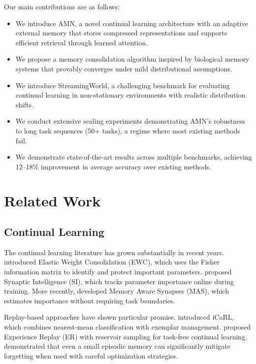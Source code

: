 \documentclass[11pt]{article}
\begin{document}
Our main contributions are as follows:
\begin{itemize}
    \item We introduce AMN, a novel continual learning architecture with an adaptive external memory that stores compressed representations and supports efficient retrieval through learned attention.
    \item We propose a memory consolidation algorithm inspired by biological memory systems that provably converges under mild distributional assumptions.
    \item We introduce StreamingWorld, a challenging benchmark for evaluating continual learning in non-stationary environments with realistic distribution shifts.
    \item We conduct extensive scaling experiments demonstrating AMN's robustness to long task sequences (50+ tasks), a regime where most existing methods fail.
    \item We demonstrate state-of-the-art results across multiple benchmarks, achieving 12--18\% improvement in average accuracy over existing methods.
\end{itemize}

\section{Related Work}
\label{sec:related}

\subsection{Continual Learning}

The continual learning literature has grown substantially in recent years. \citet{kirkpatrick2017overcoming} introduced Elastic Weight Consolidation (EWC), which uses the Fisher information matrix to identify and protect important parameters. \citet{zenke2017continual} proposed Synaptic Intelligence (SI), which tracks parameter importance online during training. More recently, \citet{aljundi2018memory} developed Memory Aware Synapses (MAS), which estimates importance without requiring task boundaries.

Replay-based approaches have shown particular promise. \citet{rebuffi2017icarl} introduced iCaRL, which combines nearest-mean classification with exemplar management. \citet{rolnick2019experience} proposed Experience Replay (ER) with reservoir sampling for task-free continual learning. \citet{chaudhry2019tiny} demonstrated that even a small episodic memory can significantly mitigate forgetting when used with careful optimization strategies.
\end{document}
